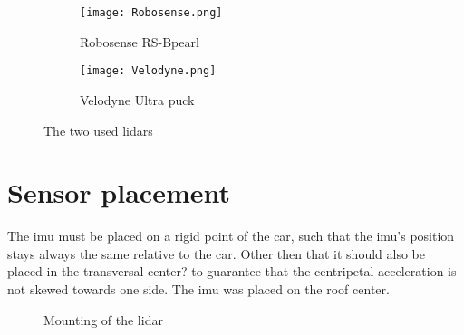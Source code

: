 \begin{figure}[htb]
	\centering
	\begin{subfigure}{0.3\textwidth}
		\centering
		\texttt{[image: Robosense.png]}
		\caption{Robosense RS-Bpearl \cite{RoboSense2020}}
		\label{fig:lidar_robosense}
	\end{subfigure}
	\begin{subfigure}{0.3\textwidth}
		\centering
		\texttt{[image: Velodyne.png]}
		\caption{Velodyne Ultra puck \cite{Velodyne2018}}
		\label{fig:lidar_velodyne}
	\end{subfigure}
	\caption{The two used \gls{lidar}s}
	\label{fig:lidars_used}
\end{figure}



\section{Sensor placement}
The \gls{imu} must be placed on a rigid point of the car, such that the \gls{imu}'s position stays always the same relative to the car.
Other then that it should also be placed in the transversal center? to guarantee that the centripetal acceleration is not skewed towards one side.
The \gls{imu} was placed on the roof center.
\begin{figure}[htpb]
	\centering
	
	\caption{Mounting of the \acrshort{lidar}}
	\label{fig:tikz_lidar_mount}
\end{figure}
